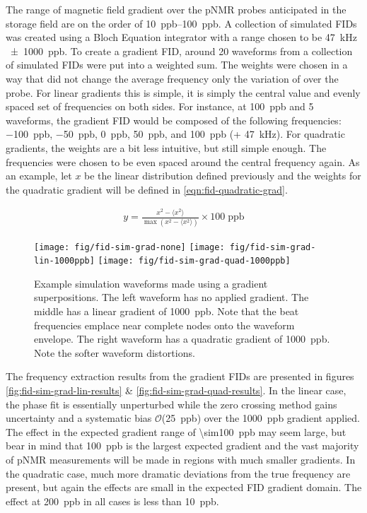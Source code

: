 The range of magnetic field gradient over the pNMR probes anticipated in the \gmtwo storage field are on the order of \SIrange{10}{100}{ppb}. A collection of simulated FIDs was created using a Bloch Equation integrator with a range chosen to be \SI{47}{\kHz} \SI{\pm 1000}{ppb}. To create a gradient FID, around 20 waveforms from a collection of simulated FIDs were put into a weighted sum.  The weights were chosen in a way that did not change the average frequency only the variation of over the probe.  For linear gradients this is simple, it is simply the central value and evenly spaced set of frequencies on both sides.  For instance, at \SI{100}{ppb} and 5 waveforms, the gradient FID would be composed of the following frequencies: \SI{-100}{ppb}, \SI{-50}{ppb}, \SI{0}{ppb}, \SI{50}{ppb}, and \SI{100}{ppb} (+ \SI{47}{\kHz}).  For quadratic gradients, the weights are a bit less intuitive, but still simple enough.  The frequencies were chosen to be even spaced around the central frequency again.  As an example, let $x$ be the linear distribution defined previously and the weights for the quadratic gradient will be defined in \ref{eqn:fid-quadratic-grad}.

\begin{align}
\label{eqn:fid-quadratic-grad}
y = \frac{x^2 - \langle x^2 \rangle}{\max{(x^2 - \langle x^2 \rangle)}} \times \mathrm{100\; ppb}
\end{align}

\begin{figure}
\centering
\texttt{[image: fig/fid-sim-grad-none]}
\texttt{[image: fig/fid-sim-grad-lin-1000ppb]}
\texttt{[image: fig/fid-sim-grad-quad-1000ppb]}
\caption{
    Example simulation waveforms made using a gradient superpositions.  The left waveform has no applied gradient.  The middle has a linear gradient of \SI{1000}{ppb}.  Note that the beat frequencies emplace near complete nodes onto the waveform envelope.  The right waveform has a quadratic gradient of \SI{1000}{ppb}.  Note the softer waveform distortions.
    \label{fig:fid-sim-grad}
}
\end{figure}

The frequency extraction results from the gradient FIDs are presented in figures \ref{fig:fid-sim-grad-lin-results} \& \ref{fig:fid-sim-grad-quad-results}.  In the linear case, the phase fit is essentially unperturbed while the zero crossing method gains uncertainty and a systematic bias $\mathcal{O}$(\SI{25}{ppb}) over the \SI{1000}{ppb} gradient applied.  The effect in the expected gradient range of \SI{\sim100}{ppb} may seem large, but bear in mind that \SI{100}{ppb} is the largest expected gradient and the vast majority of pNMR measurements will be made in regions with much smaller gradients.  In the quadratic case, much more dramatic deviations from the true frequency are present, but again the effects are small in the expected FID gradient domain.  The effect at \SI{200}{ppb} in all cases is less than \SI{10}{ppb}.


